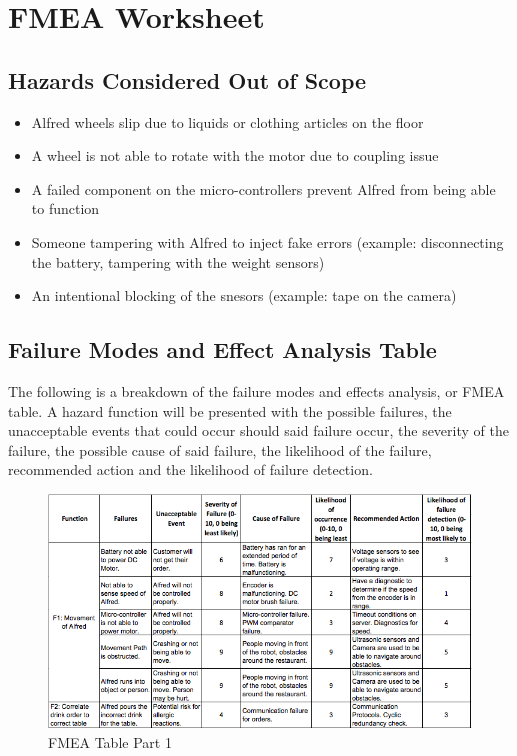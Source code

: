 \documentclass [10pt]{article}
\begin{document}
\pagebreak


\section{FMEA Worksheet}

\subsection{Hazards Considered Out of Scope}

\begin{itemize}
	\item Alfred wheels slip due to liquids or clothing articles on the floor
	\item A wheel is not able to rotate with the motor due to coupling issue
	\item A failed component on the micro-controllers prevent Alfred from being able to function
	\item Someone tampering with Alfred to inject fake errors (example: disconnecting the battery, tampering with the weight sensors)
	\item An intentional blocking of the snesors (example: tape on the camera)
\end{itemize}

\subsection{Failure Modes and Effect Analysis Table}
The following is a breakdown of the failure modes and effects analysis, or FMEA table. A hazard function will be presented with the possible failures, the unacceptable events that could occur should said failure occur, the severity of the failure, the possible cause of said failure, the likelihood of the failure, recommended action and the likelihood of failure detection.

\begin{figure} [H]
	\centering
	\includegraphics [scale = 0.7] {figures/FMEA_1.png}
	\caption{FMEA Table Part 1}
\end{figure}
\end{document}

